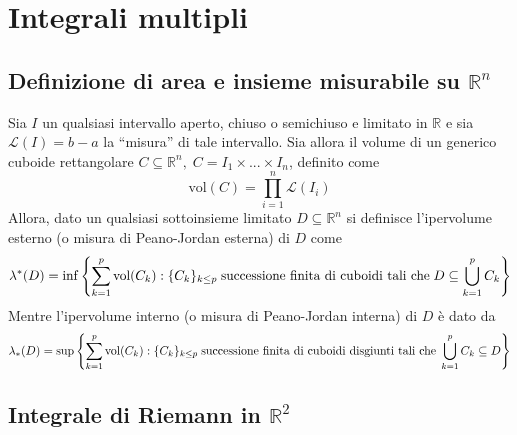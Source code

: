 
\section{Integrali multipli}
    \subsection{Definizione di area e insieme misurabile su \texorpdfstring{$\mathbb{R}^{n}$}{R alla n}}
        Sia $I$ un qualsiasi intervallo aperto, chiuso o semichiuso e limitato in $\mathbb{R}$ e sia $\mathcal{L}(I) = b - a$ la ``misura'' di tale intervallo.
        Sia allora il volume di un generico cuboide rettangolare $C \subseteq \mathbb{R}^{n}, \; C = I_{1} \times ... \times I_{n}$, definito come
        \[
            \text{vol}(C) = \prod_{i = 1}^{n} \mathcal{L}(I_{i})
        \]
        Allora, dato un qualsiasi sottoinsieme limitato $D \subseteq \mathbb{R}^{n}$ si definisce l'ipervolume esterno (o misura di Peano-Jordan esterna) di $D$ come
        \[
            \lambda^{*}(D) = \inf{\left\{ \sum_{k = 1}^{p} \text{vol}(C_{k}) \mathrel{:}\{C_{k}\}_{k \leq p} \; \textnormal{successione finita di cuboidi tali che} \; D \subseteq \bigcup_{k = 1}^{p} C_{k} \right\}}
        \]
        Mentre l'ipervolume interno (o misura di Peano-Jordan interna) di $D$ è dato da
        \[
            \lambda_{*}(D) = \sup \left\{ \sum_{k = 1}^{p} \text{vol}(C_k) \mathrel{:} \{C_k\}_{k \leq p} \; \textnormal{successione finita di cuboidi disgiunti tali che} \; \bigcup_{k = 1}^{p} C_k \subseteq D \right\}
        \]


    \subsection{Integrale di Riemann in \texorpdfstring{$\mathbb{R}^{2}$}{R2}}
